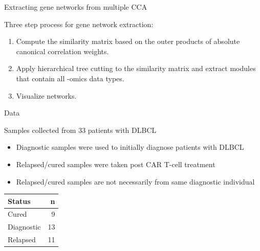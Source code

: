 \documentclass[ignorenonframetext,]{beamer}
\begin{document}
\begin{frame}{Extracting gene networks from multiple CCA}
\protect\hypertarget{extracting-gene-networks-from-multiple-cca}{}

Three step process for gene network extraction:

\begin{enumerate}
\item
  Compute the similarity matrix based on the outer products of absolute
  canonical correlation weights.
\item
  Apply hierarchical tree cutting to the similarity matrix and extract
  modules that contain all -omics data types.
\item
  Visualize networks.
\end{enumerate}

\end{frame}

\begin{frame}{Data}
\protect\hypertarget{data}{}

Samples collected from 33 patients with DLBCL

\begin{itemize}
\item
  Diagnostic samples were used to initially diagnose patients with DLBCL
\item
  Relapsed/cured samples were taken post CAR T-cell treatment
\item
  Relapsed/cured samples are not necessarily from same diagnostic
  individual
\end{itemize}

\begin{table}[H]
\centering
\begin{tabular}[t]{lr}
\toprule
Status & n\\
\midrule
Cured & 9\\
Diagnostic & 13\\
Relapsed & 11\\
\bottomrule
\end{tabular}
\end{table}

\end{frame}
\end{document}
